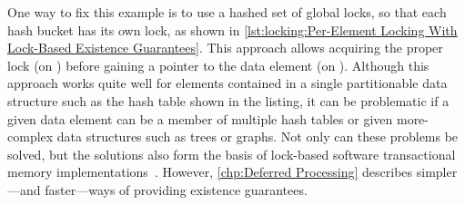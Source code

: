 \begin{fcvref}
One way to fix this example is to use a hashed set of global locks, so
that each hash bucket has its own lock, as shown in
\cref{lst:locking:Per-Element Locking With Lock-Based Existence Guarantees}.
This approach allows acquiring the proper lock (on ) before
gaining a pointer to the data element (on ).
Although this approach works quite well for elements contained in a
single partitionable data structure such as the hash table shown in the
listing, it can be problematic if a given data element can be a member
of multiple hash tables or given more-complex data structures such
as trees or graphs.
Not only can these problems be solved, but the solutions also form
the basis of lock-based software transactional memory
implementations~\cite{Shavit95,DaveDice2006DISC}.
However,
\cref{chp:Deferred Processing}
describes simpler---and faster---ways of providing existence guarantees.
\end{fcvref}
